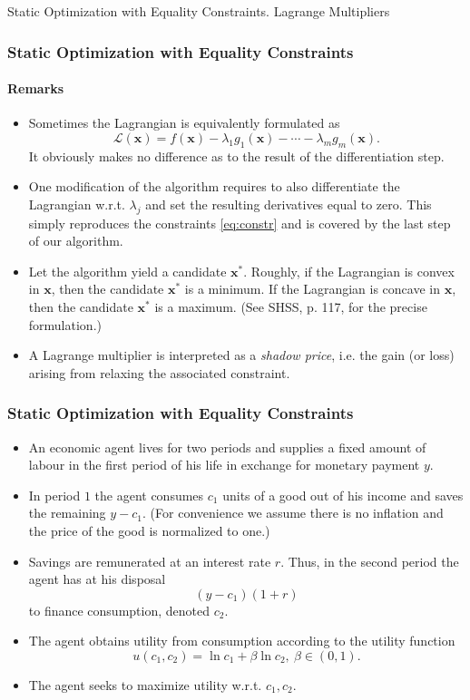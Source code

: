 \documentclass[10pt]{beamer}
\theoremstyle{definition}
\begin{document}
\begin{section}{Static Optimization with Equality Constraints. Lagrange Multipliers}
\begin{frame}[fragile]
\frametitle{Static Optimization with Equality Constraints}
\framesubtitle{Remarks}
\begin{itemize}
\item Sometimes the Lagrangian is equivalently formulated as \[ \mathcal{L}(\mathbf{x}) = f(\mathbf{x}) - \lambda_1 g_1(\mathbf{x}) - \cdots - \lambda_m g_m(\mathbf{x}). \] It obviously makes no difference as to the result of the differentiation step.
\item One modification of the algorithm requires to also differentiate the Lagrangian w.r.t. $ \lambda_j $ and set the resulting derivatives equal to zero. This simply reproduces the constraints \eqref{eq:constr} and is covered by the last step of our algorithm.
\item Let the algorithm yield a candidate $ \mathbf{x^*} $. Roughly, if the Lagrangian is convex in $ \mathbf{x} $, then the candidate $ \mathbf{x^*} $ is a minimum. If the Lagrangian is concave in $ \mathbf{x} $, then the candidate $ \mathbf{x^*} $ is a maximum. (See SHSS, p. 117, for the precise formulation.)
\item A Lagrange multiplier is interpreted as a \emph{shadow price}, i.e. the gain (or loss) arising from relaxing the associated constraint.
\end{itemize}
\end{frame}

\begin{frame}[fragile]
\frametitle{Static Optimization with Equality Constraints}
\begin{example}
\begin{itemize}
\item An economic agent lives for two periods and supplies a fixed amount of labour in the first period of his life in exchange for monetary payment $ y $.
\item In period $ 1 $ the agent consumes $ c_1 $ units of a good out of his income and saves the remaining $ y-c_1 $.  (For convenience we assume there is no inflation and the price of the good is normalized to one.)
\item Savings are remunerated at an interest rate $ r $. Thus, in the second period the agent has at his disposal \[ (y-c_1)(1+r) \] to finance consumption, denoted $ c_2 $.
\item  The agent obtains utility from consumption according to the utility function
\[ u(c_1,c_2) = \ln c_1 + \beta \ln c_2,~\beta \in (0,1) . \]
\item The agent seeks to maximize utility w.r.t. $ c_1,c_2 $.
\end{itemize}
\label{ex:intertemp}
\end{example}
\end{frame}


\end{section}
\end{document}
